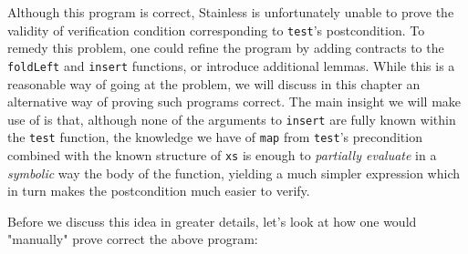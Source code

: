 \documentclass[a4paper,twoside]{article}
\newcommand{\stt}[1]{\texttt{\small{#1}}}
\begin{document}
Although this program is correct, Stainless is unfortunately unable to prove the validity of verification condition corresponding to \stt{test}'s postcondition. To remedy  this problem, one could refine the program by adding contracts to the \stt{foldLeft} and \stt{insert} functions, or introduce additional lemmas. While this is a reasonable way of going at the problem, we will discuss in this chapter an alternative way of proving such programs correct. The main insight we will make use of is that, although none of the arguments to \stt{insert} are fully known within the \stt{test} function, the knowledge we have of \stt{map} from \stt{test}'s precondition combined with the known structure of \stt{xs} is enough to \textit{partially evaluate} in a \textit{symbolic} way the body of the function, yielding a much simpler expression which in turn makes the postcondition much easier to verify.

\clearpage

Before we discuss this idea in greater details, let's look at how one would "manually" prove correct the above program:
\end{document}
